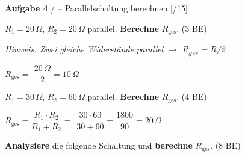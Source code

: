 \documentclass[11pt, a4paper]{article}
\newif\ifzeigesternchen
\newcommand{\lsg}[1]{\textcolor{loesung}{\textbf{#1}}}
\newcommand{\punktebox}[1]{\hfill\small\textcolor{mittelgrau}{[\hspace{0.8em}/#1]}}
\newcommand{\stern}[1]{\ifzeigesternchen\textsuperscript{\textcolor{fachfarbe}{(#1)}}\fi}
\newcommand{\aufgabe}[2]{%
    \needspace{4\baselineskip}%
    \vspace{8pt}%
    \noindent\textbf{\textcolor{fachfarbe}{Aufgabe #1}} #2%
    \vspace{4pt}%
    \nopagebreak[4]%
}
\newcommand{\operator}[1]{\textbf{#1}}
\begin{document}

\aufgabe{4}{\stern{**}/\stern{***} – Parallelschaltung berechnen} \punktebox{15}

\begin{teil}
    \item \stern{**} $R_1 = 20\,\Omega$, $R_2 = 20\,\Omega$ parallel. \operator{Berechne} $R_{\text{ges}}$. \hfill (3 BE)

    \textit{Hinweis: Zwei gleiche Widerstände parallel $\rightarrow$ R\textsubscript{ges} = R/2}

    \vspace{0.3em}
    $R_{\text{ges}} = $ \lsg{$\dfrac{20\,\Omega}{2} = 10\,\Omega$}

    \vspace{0.5em}
    \item \stern{**} $R_1 = 30\,\Omega$, $R_2 = 60\,\Omega$ parallel. \operator{Berechne} $R_{\text{ges}}$. \hfill (4 BE)

    \vspace{0.3em}
    $R_{\text{ges}} = \dfrac{R_1 \cdot R_2}{R_1 + R_2} = $ \lsg{$\dfrac{30 \cdot 60}{30 + 60} = \dfrac{1800}{90} = 20\,\Omega$}

    \vspace{0.5em}
    \item \stern{***} \operator{Analysiere} die folgende Schaltung und \operator{berechne} $R_{\text{ges}}$. \hfill (8 BE)

    \vspace{0.5em}
    \begin{center}
\end{center}
\end{teil}
\end{document}

